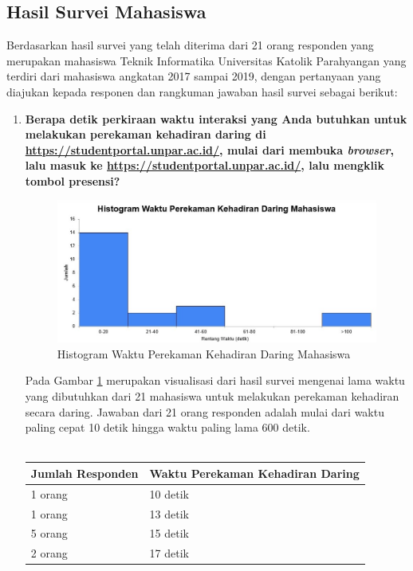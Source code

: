 \documentclass[a4paper,twoside]{article}
\begin{document}
\begin{enumerate}
		\subsection{Hasil Survei Mahasiswa}
		Berdasarkan hasil survei yang telah diterima dari 21 orang responden yang merupakan mahasiswa Teknik Informatika Universitas Katolik
		Parahyangan yang terdiri dari mahasiswa angkatan 2017 sampai 2019, dengan pertanyaan yang diajukan kepada responen dan rangkuman jawaban hasil survei sebagai berikut:
		\begin{enumerate}
			\item \textbf{Berapa detik perkiraan waktu interaksi yang Anda butuhkan untuk melakukan perekaman kehadiran daring di \url{https://studentportal.unpar.ac.id/}, mulai dari membuka \textit{browser}, lalu masuk ke \url{https://studentportal.unpar.ac.id/}, lalu mengklik tombol presensi?}
			\begin{figure}[H]
				\centering
				\includegraphics[scale=0.8]{Gambar/DaringMahasiswa.jpg}
				\caption{Histogram Waktu Perekaman Kehadiran Daring Mahasiswa} 
				\label{fig:DaringMahasiswa}
			\end{figure}
			Pada Gambar \ref{fig:DaringMahasiswa} merupakan visualisasi dari hasil survei mengenai lama waktu yang dibutuhkan dari 21 mahasiswa untuk melakukan perekaman kehadiran secara daring.
			Jawaban dari 21 orang responden adalah mulai dari waktu paling cepat 10 detik hingga waktu paling lama 600 detik.\\ \\
			\begin{tabular}{|p{4cm} |p{7cm}|}
				\hline
				Jumlah Responden &  Waktu Perekaman Kehadiran Daring \\ \hline     
				1 orang &  10 detik\\ \hline 
				1 orang &  13 detik\\ \hline 
				5 orang &  15 detik\\ \hline 
				2 orang &  17 detik\\ \hline 

\end{tabular}
\end{enumerate}
\end{enumerate}
\end{document}

